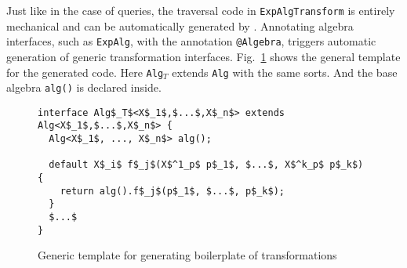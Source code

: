 Just like in the case of queries, the traversal code in \lstinline{ExpAlgTransform}
is entirely mechanical and can be automatically generated by \Name.
Annotating algebra interfaces, such as \lstinline{ExpAlg}, with the
annotation \lstinline{@Algebra}, triggers automatic generation of
generic transformation interfaces. Fig.~\ref{trafoTemplate} shows
the general template for the generated code. Here
\lstinline{Alg}$_T$ extends \lstinline{Alg} with the same sorts. And
the base algebra \lstinline{alg()} is declared inside.

\begin{figure}[t]
\nocaptionrule
\begin{lstlisting}[mathescape=true]
interface Alg$_T$<X$_1$,$...$,X$_n$> extends Alg<X$_1$,$...$,X$_n$> {
  Alg<X$_1$, ..., X$_n$> alg();

  default X$_i$ f$_j$(X$^1_p$ p$_1$, $...$, X$^k_p$ p$_k$) {
    return alg().f$_j$(p$_1$, $...$, p$_k$);
  }
  $...$
}
\end{lstlisting}
\caption{Generic template for generating boilerplate of transformations}
\label{trafoTemplate}
\end{figure}





